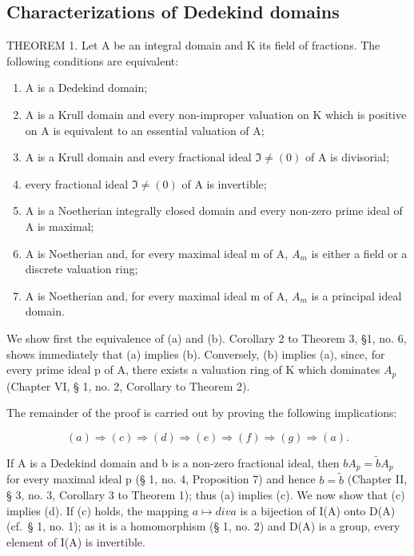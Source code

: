 \subsection{Characterizations of Dedekind domains}

THEOREM 1. Let A be an integral domain and K its field of fractions. The following conditions are equivalent:

\begin{enumerate}
\def\labelenumi{(\alph{enumi})}
\item
  A is a Dedekind domain;
\item
  A is a Krull domain and every non-improper valuation on K which is positive on A is equivalent to an essential valuation of A;
\item
  A is a Krull domain and every fractional ideal \(\Im \neq (0)\) of A is divisorial;
\item
  every fractional ideal \(\Im \neq (0)\) of A is invertible;
\item
  A is a Noetherian integrally closed domain and every non-zero prime ideal of A is maximal;
\item
  A is Noetherian and, for every maximal ideal m of A, \(A_{m}\) is either a field or a discrete valuation ring;
\item
  A is Noetherian and, for every maximal ideal m of A, \(A_{m}\) is a principal ideal domain.
\end{enumerate}

We show first the equivalence of (a) and (b). Corollary 2 to Theorem 3, §1, no. 6, shows immediately that (a) implies (b). Conversely, (b) implies (a), since, for every prime ideal p of A, there exists a valuation ring of K which dominates \(A_{p}\) (Chapter VI, § 1, no. 2, Corollary to Theorem 2).

The remainder of the proof is carried out by proving the following implications:

\[
(a) \Rightarrow (c) \Rightarrow (d) \Rightarrow (e) \Rightarrow (f) \Rightarrow (g) \Rightarrow (a).
\]

If A is a Dedekind domain and b is a non-zero fractional ideal, then \(bA_{p} = \tilde{b}A_{p}\) for every maximal ideal p (§ 1, no. 4, Proposition 7) and hence \(b = \tilde{b}\) (Chapter II, § 3, no. 3, Corollary 3 to Theorem 1); thus (a) implies (c). We now show that (c) implies (d). If (c) holds, the mapping \(a \mapsto div a\) is a bijection of I(A) onto D(A) (cf.~§ 1, no. 1); as it is a homomorphism (§ 1, no. 2) and D(A) is a group, every element of I(A) is invertible.

